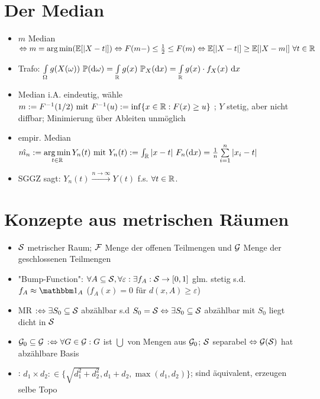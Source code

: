 \documentclass[12pt]{scrartcl}
\begin{document}
	\section{Der Median}
	\begin{itemize}
		\item $m$ Median $\gdw m=\argmin(\E[|X-t|])\gdw F(m-)\leq\frac{1}{2}\leq F(m)\gdw \E[|X-t|]\geq\E[|X-m|]~\forall t\in\R$
		\item Trafo: $\int\limits_\Omega g(X(\omega))~\P(\d\omega)
		=\int\limits_\R g(x)~\P_X(\d x)
		=\int\limits_\R g(x)\cdot f_X(x)\ds x$
		\item Median i.A.  eindeutig, wähle $m:=F^{-1}(1/2)\mit F^{-1}(u):=\inf\lbrace x\in\R:F(x)\geq u\rbrace$ ; $Y$ stetig, aber nicht diffbar; Minimierung über Ableiten unmöglich
		\item empir. Median $\hat{m_n}:=\argmin\limits_{t\in\R}Y_n(t)\mit Y_n(t):=\int_\R|x-t|~F_n(\d x)=\frac{1}{n}\sum\limits_{i=1}^n|x_i-t|$
		\item SGGZ sagt: $Y_n(t)\overset{n\to\infty}{\longrightarrow}Y(t)$ f.s. $\forall t\in\R$.
	\end{itemize}
	
	\section{Konzepte aus metrischen Räumen}
	\begin{itemize}
		\item $\S$ metrischer Raum; $\F$ Menge der offenen Teilmengen und $\G$ Menge der geschlossenen Teilmengen
		\item "Bump-Function": $\forall A\subseteq\S,\forall\varepsilon:\exists f_A:\S\to[0,1]$ glm. stetig s.d. $f_A\approx\indi_A$ ($f_A(x)=0$ für $d(x,A)\geq\varepsilon$)
		\item MR  $:\gdw\exists S_0\subseteq\S$ abzählbar s.d $S_0=\S\gdw\exists S_0\subseteq\S$ abzählbar mit $S_0$ liegt dicht in $\S$
		\item $\G_0\subseteq\G$  $:\gdw\forall G\in\G:G$ ist $\bigcup$ von Mengen aus $\G_0$; $\S$ separabel $\gdw\G(\S)$ hat abzählbare Basis
		\item {}: $d_1\times d_2:\in\big\lbrace \sqrt{d_1^2+d_2^2}, d_1+d_2,\max(d_1,d_2)\big\rbrace$; sind äquivalent, erzeugen selbe Topo
	\end{itemize}
	
\end{document}
